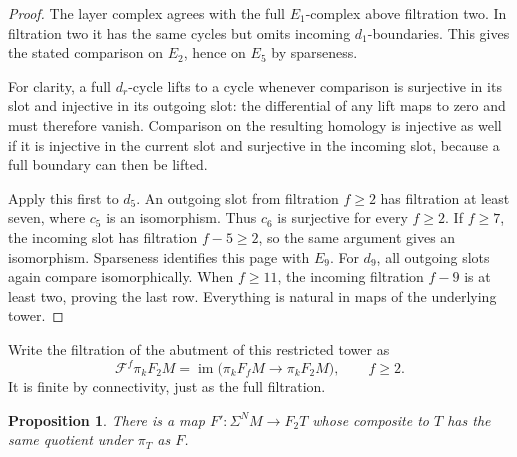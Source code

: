 \documentclass[11pt]{article}
\newtheorem{proposition}[theorem]{Proposition}
\theoremstyle{definition}
\theoremstyle{remark}
\numberwithin{equation}{section}
\begin{document}
\begin{proof}
The layer complex agrees with the full \(E_1\)-complex
above filtration two.  In filtration two it has the
same cycles but omits incoming \(d_1\)-boundaries.
This gives the stated comparison on \(E_2\), hence on
\(E_5\) by sparseness.

For clarity, a full \(d_r\)-cycle lifts to a cycle
whenever comparison is surjective in its slot and
injective in its outgoing slot: the differential of
any lift maps to zero and must therefore vanish.
Comparison on the resulting homology is injective
as well if it is injective in the current slot and
surjective in the incoming slot, because a full
boundary can then be lifted.

Apply this first to \(d_5\).  An outgoing slot from
filtration \(f\geq2\) has filtration at least seven,
where \(c_5\) is an isomorphism.  Thus \(c_6\) is
surjective for every \(f\geq2\).  If \(f\geq7\), the
incoming slot has filtration \(f-5\geq2\), so the
same argument gives an isomorphism.  Sparseness
identifies this page with \(E_9\).
For \(d_9\), all outgoing slots again compare
isomorphically.  When \(f\geq11\), the incoming
filtration \(f-9\) is at least two, proving the
last row.  Everything is natural in maps of the
underlying tower.
\end{proof}

Write the filtration of the abutment of this restricted
tower as
\[
 \mathcal F^f\pi_kF_2M
   =\operatorname{im}\bigl(\pi_kF_fM\longrightarrow\pi_kF_2M\bigr),
 \qquad f\geq2.
\]
It is finite by connectivity, just as the full filtration.

\begin{proposition}\label{cube:correction}
There is a map \(F':\Sigma^NM\to F_2T\) whose composite
to \(T\) has the same quotient under \(\pi_T\) as \(F\).
\end{proposition}
\end{document}
